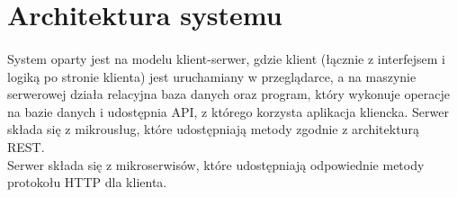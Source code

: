 \documentclass{article}
\begin{document}
	\section{Architektura systemu}
	\paragraph{} System oparty jest na modelu klient-serwer, gdzie klient (łącznie z interfejsem i logiką po stronie klienta) jest uruchamiany w przeglądarce, a na maszynie serwerowej działa relacyjna baza danych oraz program, który wykonuje operacje na bazie danych i udostępnia API, z którego korzysta aplikacja kliencka. Serwer składa się z mikrousług, które udostępniają metody zgodnie z architekturą REST. \\[0.5cm]
	Serwer składa się z mikroserwisów, które udostępniają odpowiednie metody protokołu HTTP dla klienta.
	
\end{document}
